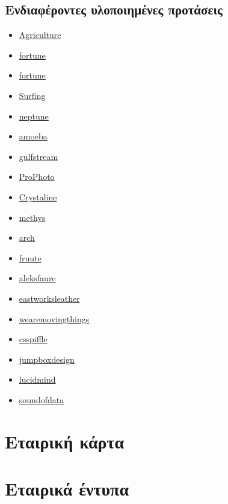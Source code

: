 \documentclass[a4paper, 12pt, twoside]{report}
\begin{document}
		\section{Ενδιαφέροντες υλοποιημένες προτάσεις}
			\begin{itemize}
				\item \href{http://www.templatemonster.com/demo/39989.html}{Agriculture}
				\item \href{http://www.templatemonster.com/demo/39987.html}{fortune}
				\item \href{http://www.templatemonster.com/demo/39985.html}{fortune}
				\item \href{http://www.templatemonster.com/demo/39988.html}{Surfing}
				\item \href{http://www.themeshark.com/demo/neptune/}{neptune}
				\item \href{http://www.themeshark.com/demo/amoeba/}{amoeba}
				\item \href{http://www.themeshark.com/demo/gulfstream/}{gulfstream}
				\item \href{http://switcher.sooperthemes.com/?theme=prophoto}{ProPhoto}
				\item \href{http://demo.rockettheme.com/drupal/?theme=crystalline}{Crystaline}
				\item \href{http://demo.themebrain.com/#methys_ii}{methys}
				\item \href{http://www.templatemonster.com/demo/39138.html}{arch}
				\item \href{http://www.fruute.com/}{fruute}
				\item \href{http://aleksfaure.com/}{aleksfaure}
				\item \href{http://www.eastworksleather.com/}{eastworksleather}
				\item \href{http://www.wearemovingthings.com/}{wearemovingthings}
				\item \href{http://pitch.csspiffle.com/}{csspiffle}
				\item \href{http://www.jumpboxdesign.co.uk/about.html}{jumpboxdesign}
				\item \href{http://www.lucidmind.net/index.php}{lucidmind}
				\item \href{http://soundofdata.nl/en/}{soundofdata}				
			\end{itemize}
	
	\chapter{Εταιρική κάρτα}
	
	\chapter{Εταιρικά έντυπα}
		
	
	
	
		
		
		

	\cleardoublepage
	\label{κεφ.:Βιβλιογραφία}
	\printbibliography[title={Βιβλιογραφία}]
	
\end{document}
